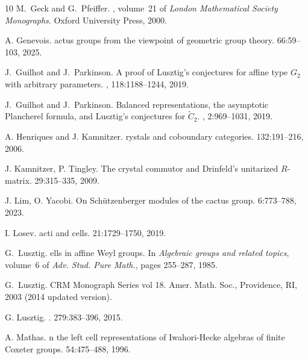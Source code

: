 \documentclass[11pt]{article}
\theoremstyle{plain}
\theoremstyle{definition}
\numberwithin{equation}{section}
\begin{document}
\begin{thebibliography}{10}
M.~{G}eck and G.~{P}feiffer.
, volume~21 of {\em London Mathematical Society Monographs}.
\newblock Oxford University Press, 2000.


A. Genevois.
actus groups from the viewpoint of geometric group theory.
 66:59--103, 2025. 


J.~{G}uilhot and J.~{P}arkinson.
\newblock A proof of {L}usztig's conjectures for affine type ${G}_2$ with
  arbitrary parameters.
, 118:1188--1244, 2019.


J.~{G}uilhot and J.~{P}arkinson.
\newblock Balanced representations, the asymptotic {P}lancherel formula, and
  {L}usztig's conjectures for $\tilde{C}_2$.
, 2:969--1031, 2019.



A. Henriques and J. Kamnitzer.
rystals and coboundary categories.
 132:191--216, 2006. 


J. Kamnitzer, P. Tingley.
\newblock The crystal commutor and Drinfeld's unitarized $R$-matrix.
 29:315--335, 2009. 



J. Lim, O. Yacobi. 
\newblock On Sch\"utzenberger modules of the cactus group.
 6:773--788, 2023. 

I. Losev.
acti and cells.
 21:1729--1750, 2019. 

G.~Lusztig.
ells in affine {W}eyl groups.
\newblock In {\em {A}lgebraic groups and related topics}, volume~6 of {\em Adv.
  Stud. Pure Math.}, pages 255--287, 1985.

G.~Lusztig.
\newblock CRM Monograph Series vol 18. Amer. Math. Soc., Providence, RI, 2003 (2014 updated version).

G. Lusztig.
.
 279:383--396, 2015. 

A. Mathas.
n the left cell representations of Iwahori-Hecke algebras of finite Coxeter groups.
 54:475--488, 1996. 



\end{thebibliography}
\end{document}
